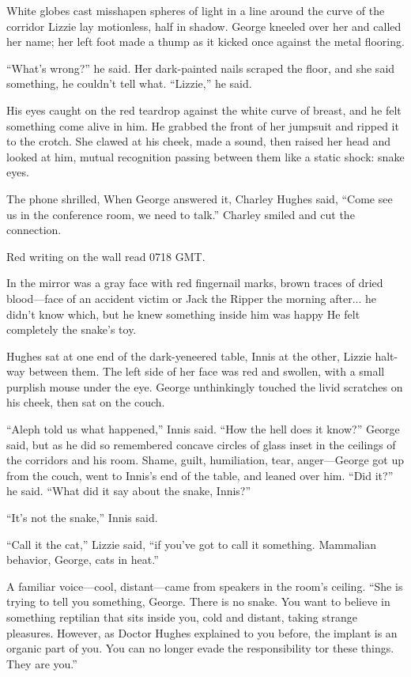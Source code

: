 White globes cast misshapen spheres of light in a line around the curve of the corridor Lizzie lay motionless, half in shadow. George kneeled over her and called her name; her left foot made a thump as it kicked once against the metal flooring.

``What's wrong?'' he said. Her dark-painted nails scraped the floor, and she said something, he couldn't tell what. ``Lizzie,'' he said.

His eyes caught on the red teardrop against the white curve of breast, and he felt something come alive in him. He grabbed the front of her jumpsuit and ripped it to the crotch. She clawed at his cheek, made a sound, then raised her head and looked at him, mutual recognition passing between them like a static shock: snake eyes.

The phone shrilled, When George answered it, Charley Hughes said, ``Come see us in the conference room, we need to talk.'' Charley smiled and cut the connection.

Red writing on the wall read 0718 GMT.

In the mirror was a gray face with red fingernail marks, brown traces of dried blood—face of an accident victim or Jack the Ripper the morning after... he didn't know which, but he knew something inside him was happy He felt completely the snake's toy.

Hughes sat at one end of the dark-yeneered table, Innis at the other, Lizzie halt-way between them. The left side of her face was red and swollen, with a small purplish mouse under the eye. George unthinkingly touched the livid scratches on his cheek, then sat on the couch.

``Aleph told us what happened,'' Innis said. ``How the hell does it know?'' George said, but as he did so remembered concave circles of glass inset in the ceilings of the corridors and his room. Shame, guilt, humiliation, tear, anger—George got up from the couch, went to Innis's end of the table, and leaned over him. ``Did it?'' he said. ``What did it say about the snake, Innis?''

``It's not the snake,'' Innis said.

``Call it the cat,'' Lizzie said, ``if you've got to call it something. Mammalian behavior, George, cats in heat.''

A familiar voice—cool, distant—came from speakers in the room's ceiling. ``She is trying to tell you something, George. There is no snake. You want to believe in something reptilian that sits inside you, cold and distant, taking strange pleasures. However, as Doctor Hughes explained to you before, the implant is an organic part of you. You can no longer evade the responsibility tor these things. They are you.''

